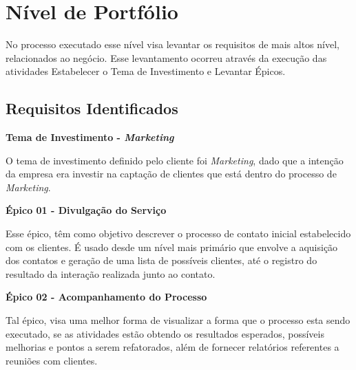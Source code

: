 \chapter[Nível de Portfólio]{Nível de Portfólio}

No processo executado esse nível visa levantar os requisitos de mais altos nível, relacionados ao negócio. Esse levantamento
ocorreu através da execução das atividades Estabelecer o Tema de Investimento e Levantar Épicos.

\section{Requisitos Identificados}

\textbf{Tema de Investimento - \textit{Marketing}}

O tema de investimento definido pelo cliente foi \textit{Marketing}, dado que a intenção da empresa era investir na captação de clientes que está
dentro do processo de \textit{Marketing}.

\textbf{Épico 01 - Divulgação do Serviço}

Esse épico, têm como objetivo descrever o processo de contato inicial estabelecido com os clientes. É usado desde um nível mais primário que envolve a aquisição dos contatos e geração de uma lista de possíveis clientes, até o registro do resultado da interação realizada junto ao contato.


\textbf{Épico 02 - Acompanhamento do Processo}

Tal épico, visa uma melhor forma de visualizar a forma que o processo esta sendo executado, se as atividades estão obtendo os resultados esperados, possíveis melhorias e pontos a serem refatorados, além de fornecer relatórios referentes a reuniões com clientes.
